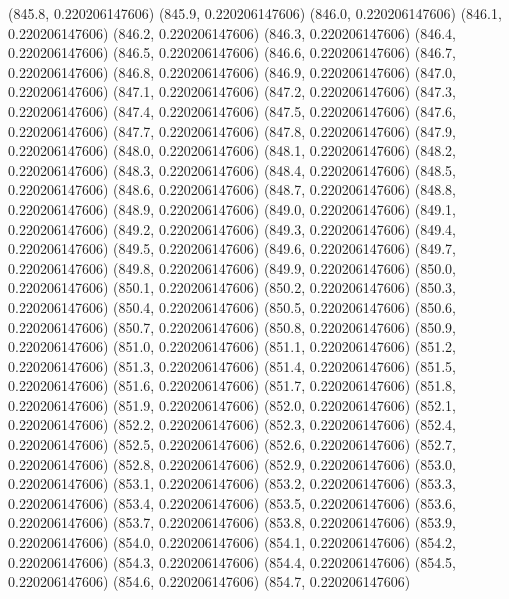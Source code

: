{					(845.8, 0.220206147606)
					(845.9, 0.220206147606)
					(846.0, 0.220206147606)
					(846.1, 0.220206147606)
					(846.2, 0.220206147606)
					(846.3, 0.220206147606)
					(846.4, 0.220206147606)
					(846.5, 0.220206147606)
					(846.6, 0.220206147606)
					(846.7, 0.220206147606)
					(846.8, 0.220206147606)
					(846.9, 0.220206147606)
					(847.0, 0.220206147606)
					(847.1, 0.220206147606)
					(847.2, 0.220206147606)
					(847.3, 0.220206147606)
					(847.4, 0.220206147606)
					(847.5, 0.220206147606)
					(847.6, 0.220206147606)
					(847.7, 0.220206147606)
					(847.8, 0.220206147606)
					(847.9, 0.220206147606)
					(848.0, 0.220206147606)
					(848.1, 0.220206147606)
					(848.2, 0.220206147606)
					(848.3, 0.220206147606)
					(848.4, 0.220206147606)
					(848.5, 0.220206147606)
					(848.6, 0.220206147606)
					(848.7, 0.220206147606)
					(848.8, 0.220206147606)
					(848.9, 0.220206147606)
					(849.0, 0.220206147606)
					(849.1, 0.220206147606)
					(849.2, 0.220206147606)
					(849.3, 0.220206147606)
					(849.4, 0.220206147606)
					(849.5, 0.220206147606)
					(849.6, 0.220206147606)
					(849.7, 0.220206147606)
					(849.8, 0.220206147606)
					(849.9, 0.220206147606)
					(850.0, 0.220206147606)
					(850.1, 0.220206147606)
					(850.2, 0.220206147606)
					(850.3, 0.220206147606)
					(850.4, 0.220206147606)
					(850.5, 0.220206147606)
					(850.6, 0.220206147606)
					(850.7, 0.220206147606)
					(850.8, 0.220206147606)
					(850.9, 0.220206147606)
					(851.0, 0.220206147606)
					(851.1, 0.220206147606)
					(851.2, 0.220206147606)
					(851.3, 0.220206147606)
					(851.4, 0.220206147606)
					(851.5, 0.220206147606)
					(851.6, 0.220206147606)
					(851.7, 0.220206147606)
					(851.8, 0.220206147606)
					(851.9, 0.220206147606)
					(852.0, 0.220206147606)
					(852.1, 0.220206147606)
					(852.2, 0.220206147606)
					(852.3, 0.220206147606)
					(852.4, 0.220206147606)
					(852.5, 0.220206147606)
					(852.6, 0.220206147606)
					(852.7, 0.220206147606)
					(852.8, 0.220206147606)
					(852.9, 0.220206147606)
					(853.0, 0.220206147606)
					(853.1, 0.220206147606)
					(853.2, 0.220206147606)
					(853.3, 0.220206147606)
					(853.4, 0.220206147606)
					(853.5, 0.220206147606)
					(853.6, 0.220206147606)
					(853.7, 0.220206147606)
					(853.8, 0.220206147606)
					(853.9, 0.220206147606)
					(854.0, 0.220206147606)
					(854.1, 0.220206147606)
					(854.2, 0.220206147606)
					(854.3, 0.220206147606)
					(854.4, 0.220206147606)
					(854.5, 0.220206147606)
					(854.6, 0.220206147606)
					(854.7, 0.220206147606)
}
